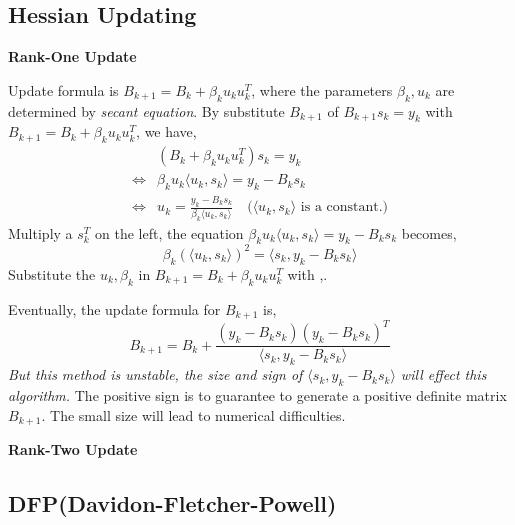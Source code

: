 	\subsection{Hessian Updating}
	\textbf{Rank-One Update}
	\par Update formula is $B_{k+1} = B_k+\beta_k u_k u_{k}^T$, where the parameters $\beta_k,u_k$ are determined by \emph{secant equation}.
	By substitute $B_{k+1}$ of $	B_{k+1}s_k=y_k$ with $B_{k+1} = B_k+\beta_k u_k u_{k}^T$, we have,
	\begin{equation} \label{formula rank one update1}
		\begin{split}
				&(B_k+\beta_k u_k u_{k}^T)s_k=y_k \\
				\Leftrightarrow & \beta_k u_k\langle u_k,s_k\rangle = y_k-B_ks_k\\
				\Leftrightarrow & u_k =\frac{y_k-B_k s_k}{\beta_k\langle u_k,s_k\rangle} \quad \text{($\langle u_k,s_k\rangle$ is a constant.)}
		\end{split}
	\end{equation}
	Multiply a $s_k^T$ on the left, the equation $\beta_k u_k\langle u_k,s_k\rangle = y_k-B_ks_k$ becomes,
	\begin{equation} \label{formula rank one update2}
	\beta_k (\langle u_k,s_k\rangle)^2 = \langle s_k,y_k-B_ks_k\rangle
	\end{equation}
	Substitute the $u_k,\beta_k$ in $B_{k+1} = B_k+\beta_k u_k u_{k}^T$ with ,.
	
	Eventually, the update formula for $B_{k+1}$ is,
	$$
		B_{k+1} = B_{k} +\frac{(y_k-B_k s_k)(y_k-B_k s_k)^T}{\langle s_k,y_k-B_k s_k\rangle}
	$$
	\emph{But this method is unstable, the size and sign of $\langle s_k,y_k-B_k s_k\rangle$ will effect this algorithm.} The positive sign is to guarantee to generate a positive definite matrix $B_{k+1}$. The small size will lead to numerical difficulties. 
	
	
	\textbf{Rank-Two Update}
	\subsection{DFP(Davidon-Fletcher-Powell)}
	
	
	\ifx\allfiles\undefined

\fi